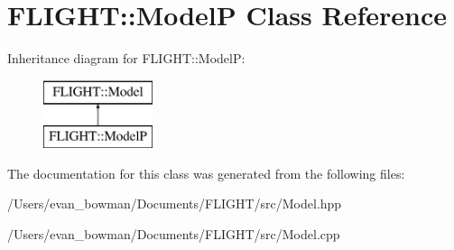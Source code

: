 \hypertarget{class_f_l_i_g_h_t_1_1_model_p}{}\section{F\+L\+I\+G\+HT\+:\+:ModelP Class Reference}
\label{class_f_l_i_g_h_t_1_1_model_p}
Inheritance diagram for F\+L\+I\+G\+HT\+:\+:ModelP\+:\begin{figure}[H]
\begin{center}
\leavevmode
\includegraphics[height=2.000000cm]{class_f_l_i_g_h_t_1_1_model_p}
\end{center}
\end{figure}


The documentation for this class was generated from the following files\+:\begin{DoxyCompactItemize}
\item 
/\+Users/evan\+\_\+bowman/\+Documents/\+F\+L\+I\+G\+H\+T/src/Model.\+hpp\item 
/\+Users/evan\+\_\+bowman/\+Documents/\+F\+L\+I\+G\+H\+T/src/Model.\+cpp\end{DoxyCompactItemize}
